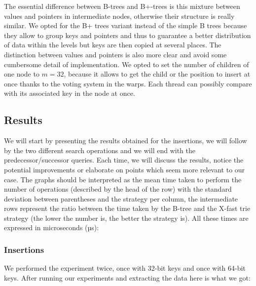 The essential difference between B-trees and B+-trees is this mixture between values and pointers in intermediate nodes, otherwise their structure is really similar. We opted for the B+ trees variant instead of the simple B trees because they allow to group keys and pointers and thus to guarantee a better distribution of data within the levels but keys are then copied at several places. The distinction between values and pointers is also more clear and avoid some cumbersome detail of implementation. We opted to set the number of children of one node to $m = 32$, because it allows to get the child or the position to insert at once thanks to the voting system in the warps. Each thread can possibly compare with its associated key in the node at once.

\subsection{Results}

We will start by presenting the results obtained for the insertions, we will follow by the two different search operations and we will end with the predecessor/successor queries. Each time, we will discuss the results, notice the potential improvements or elaborate on points which seem more relevant to our case. The graphs should be interpreted as the mean time taken to perform the number of operations (described by the head of the row) with the standard deviation between parentheses and the strategy per column, the intermediate rows represent the ratio between the time taken by the B-tree and the X-fast trie strategy (the lower the number is, the better the strategy is). All these times are expressed in microseconds (µs):

\subsubsection{Insertions}

We performed the experiment twice, once with 32-bit keys and once with 64-bit keys. After running our experiments and extracting the data here is what we got:

